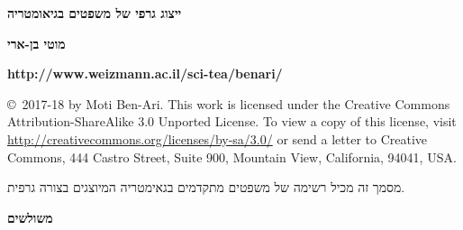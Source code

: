 \documentclass[12pt,a4paper]{article}
\begin{document}
\thispagestyle{empty}

\begin{center}
\textbf{\Large ייצוג גרפי של משפטים בגיאומטריה}

\bigskip

\textbf{\large מוטי בן-ארי}

\bigskip
{}

\textbf{\sffamily \large http://www.weizmann.ac.il/sci-tea/benari/}
\end{center}

\bigskip


\begin{scriptsize}
\copyright{}\  2017-18 by Moti Ben-Ari. This work is licensed under the Creative Commons Attribution-ShareAlike 3.0 Unported License. To view a copy of this license, visit \url{http://creativecommons.org/licenses/by-sa/3.0/} or send a letter to Creative Commons, 444 Castro Street, Suite 900, Mountain View, California, 94041, USA.
\end{scriptsize}


\bigskip


מסמך זה מכיל רשימה של משפטים מתקדמים בגאימטריה המיוצגים בצורה גרפית.

\begin{center}
\large\sffamily\bfseries משולשים
\end{center}
\end{document}
